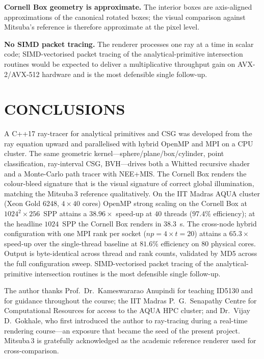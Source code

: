 \documentclass[twocolumn,10pt,cleanhead,cleanfoot]{asme2e}
\begin{document}
\noindent\textbf{Cornell Box geometry is approximate.} The interior boxes are axis-aligned approximations of the canonical rotated boxes; the visual comparison against Mitsuba's reference is therefore approximate at the pixel level.

\noindent\textbf{No SIMD packet tracing.} The renderer processes one ray at a time in scalar code; SIMD-vectorised packet tracing of the analytical-primitive intersection routines would be expected to deliver a multiplicative throughput gain on AVX-2/AVX-512 hardware and is the most defensible single follow-up.

\section*{CONCLUSIONS}

A C++17 ray-tracer for analytical primitives and CSG was developed from the ray equation upward and parallelised with hybrid OpenMP and MPI on a CPU cluster. The same geometric kernel---sphere/plane/box/cylinder, point classification, ray-interval CSG, BVH---drives both a Whitted recursive shader and a Monte-Carlo path tracer with NEE+MIS. The Cornell Box renders the colour-bleed signature that is the visual signature of correct global illumination, matching the Mitsuba\,3 reference qualitatively. On the IIT Madras AQUA cluster (Xeon Gold 6248, $4\times 40$ cores) OpenMP strong scaling on the Cornell Box at $1024^2 \times 256$~SPP attains a $38.96\times$ speed-up at $40$ threads ($97.4\%$ efficiency); at the headline $1024$~SPP the Cornell Box renders in $38.3$~s. The cross-node hybrid configuration with one MPI rank per socket ($np=4 \times t=20$) attains a $65.3\times$ speed-up over the single-thread baseline at $81.6\%$ efficiency on $80$ physical cores. Output is byte-identical across thread and rank counts, validated by MD5 across the full configuration sweep. SIMD-vectorised packet tracing of the analytical-primitive intersection routines is the most defensible single follow-up.

\begin{acknowledgment}
The author thanks Prof.~Dr.~Kameswararao Anupindi for teaching ID5130 and for guidance throughout the course; the IIT Madras P.~G.~Senapathy Centre for Computational Resources for access to the AQUA HPC cluster; and Dr.~Vijay D.~Gokhale, who first introduced the author to ray-tracing during a real-time rendering course---an exposure that became the seed of the present project. Mitsuba\,3 is gratefully acknowledged as the academic reference renderer used for cross-comparison.
\end{acknowledgment}




\end{document}
